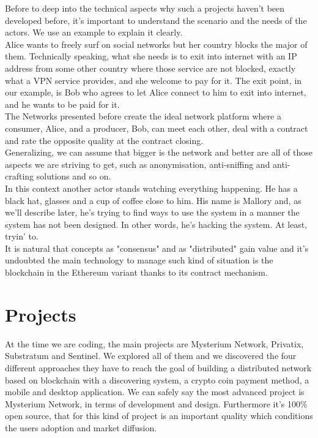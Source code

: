 \documentclass[]{article}
\begin{document}
	Before to deep into the technical aspects why such a projects haven't been developed before, it's important to understand the scenario and the needs of the actors. We use an example to explain it clearly.\\
	Alice wants to freely surf on social networks but her country blocks the major of them. Technically speaking, what she needs is to exit into internet with an IP address from some other country where those service are not blocked, exactly what a VPN service provides, and she welcome to pay for it. 
	The exit point, in our example, is Bob who agrees to let Alice connect to him to exit into internet, and he wants to be paid for it.\\
	The Networks presented before create the ideal network platform where a consumer, Alice, and a producer, Bob, can meet each other, deal with a contract and rate the opposite quality at the contract closing.\\
	Generalizing, we can assume that bigger is the network and better are all of those aspects we are striving to get, such as anonymisation, anti-sniffing and anti-crafting solutions and so on.\\
	In this context another actor stands watching everything happening. He has a black hat, glasses and a cup of coffee close to him. His name is Mallory and, as we'll describe later, he's trying to find ways to use the system in a manner the system has not been designed. In other words, he's hacking the system. At least, tryin' to.\\
	
	
	It is natural that concepts as "consensus" and as "distributed" gain value and it's undoubted the main technology to manage such kind of situation is the blockchain in the Ethereum variant thanks to its contract mechanism.\\
	
	
	\section{Projects}
	At the time we are coding, the main projects are Mysterium Network, Privatix, Substratum and Sentinel. We explored all of them and we discovered the four different approaches they have to reach the goal of building a distributed network based on blockchain with a discovering system, a crypto coin payment method, a mobile and desktop application. We can safely say the most advanced project is Mysterium Network, in terms of development and design. Furthermore it's 100\% open source, that for this kind of project is an important quality which conditions the users adoption and market diffusion.
\end{document}
